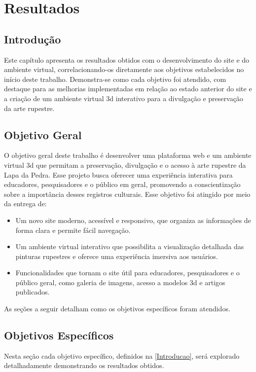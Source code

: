  \chapter{Resultados}
\label{cap:resultados}

\section{Introdução}
Este capítulo apresenta os resultados obtidos com o desenvolvimento do site e do ambiente virtual, correlacionando-os diretamente aos objetivos estabelecidos no início deste trabalho. Demonstra-se como cada objetivo foi atendido, com destaque para as melhorias implementadas em relação ao estado anterior do site e a criação de um ambiente virtual \gls{3d} interativo para a divulgação e preservação da arte rupestre.

\section{Objetivo Geral}
O objetivo geral deste trabalho é desenvolver uma plataforma web e um ambiente virtual \gls{3d} que permitam a preservação, divulgação e o acesso à arte rupestre da Lapa da Pedra. Esse projeto busca oferecer uma experiência interativa para educadores, pesquisadores e o público em geral, promovendo a conscientização sobre a importância desses registros culturais. Esse objetivo foi atingido por meio da entrega de:
\begin{itemize}
    \item Um novo site moderno, acessível e responsivo, que organiza as informações de forma clara e permite fácil navegação.
    \item Um ambiente virtual interativo que possibilita a visualização detalhada das pinturas rupestres e oferece uma experiência imersiva aos usuários.
    \item Funcionalidades que tornam o site útil para educadores, pesquisadores e o público geral, como galeria de imagens, acesso a modelos \gls{3d} e artigos publicados.
\end{itemize}

As seções a seguir detalham como os objetivos específicos foram atendidos.

\section{Objetivos Específicos}
Nesta seção cada objetivo específico, definidos na \ref{Introducao}, será explorado detalhadamente demonstrando os resultados obtidos. 

